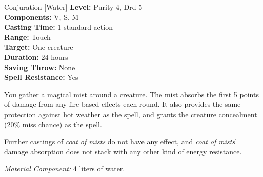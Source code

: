 {Conjuration [Water]}
{
	\textbf{Level:}
	Purity 4, Drd 5\\
	\textbf{Components:}
	V, S, M\\
	\textbf{Casting Time:}
	1 standard action\\
	\textbf{Range:}
	Touch\\
	\textbf{Target:}
	One creature\\
	\textbf{Duration:}
	24 hours\\
	\textbf{Saving Throw:}
	None\\
	\textbf{Spell Resistance:}
	Yes\\
}
{
	You gather a magical mist around a creature. The mist absorbs the first 5 points of damage from any fire-based effects each round. It also provides the same protection against hot weather as the  spell, and grants the creature concealment (20\% miss chance) as the  spell.

	Further castings of \emph{coat of mists} do not have any effect, and \emph{coat of mists}' damage absorption does not stack with any other kind of energy resistance.

	\textit{Material Component:} 4 liters of water.
}
